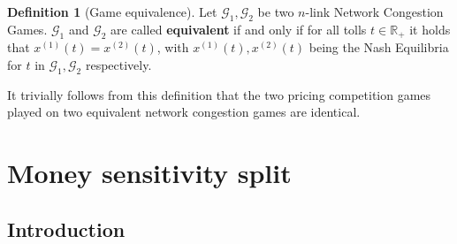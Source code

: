 \documentclass[10pt,a4paper]{book}
\newcommand{\R}{\mathbb{R}}
\newcommand{\Gm}{\mathcal{G}}
\theoremstyle{definition}
\newtheorem{definition}{Definition}[chapter]
\theoremstyle{comment}
\begin{document}
\begin{definition}[Game equivalence]
	\label{definition:game_equivalence}
	Let $\Gm_1, \Gm_2$ be two $n$-link Network Congestion Games.
	$\Gm_1$ and $\Gm_2$ are called \textbf{equivalent} if and only if for all tolls $t \in \R_+$ it holds that $x^{(1)}(t) = x^{(2)}(t)$, with $x^{(1)}(t), x^{(2)}(t)$ being the Nash Equilibria for $t$ in $\Gm_1, \Gm_2$ respectively.
\end{definition}

It trivially follows from this definition that the two pricing competition games played on two equivalent network congestion games are identical.

\chapter{Money sensitivity split}
\label{chapter:split}

\section{Introduction}
\end{document}
